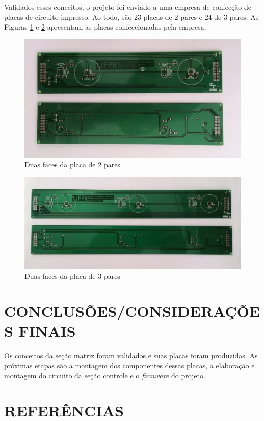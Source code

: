 \documentclass[a4paper,12pt]{article}
\begin{document}
  \clearpage
  
  Validados esses conceitos, o projeto foi enviado a uma empresa de confecção de placas de circuito impresso. Ao todo, são 23 placas de 2 pares e 24 de 3 pares. As Figuras \ref{fig:bloco-2} e \ref{fig:bloco-3} apresentam as placas confeccionadas pela empresa.
   
  \begin{figure}[!h]
    \caption{Duas faces da placa de 2 pares}
    \label{fig:bloco-2}
    \centering
    \includegraphics[width=0.95\linewidth]{img/bloco-2.jpg}
  \end{figure}
    
  \begin{figure}[!h]
    \caption{Duas faces da placa de 3 pares}
    \label{fig:bloco-3}
    \centering
    \includegraphics[width=0.95\linewidth]{img/bloco-3.jpg}
  \end{figure}
  
  \clearpage
  \section{CONCLUSÕES/CONSIDERAÇÕES FINAIS}
  
  Os conceitos da seção matriz foram validados e suas placas foram produzidas. As próximas etapas são a montagem dos componentes dessas placas, a elaboração e montagem do circuito da seção controle e o \emph{firmware} do projeto.
  
  \clearpage
  \section{REFERÊNCIAS}
  \printbibliography
\end{document}
